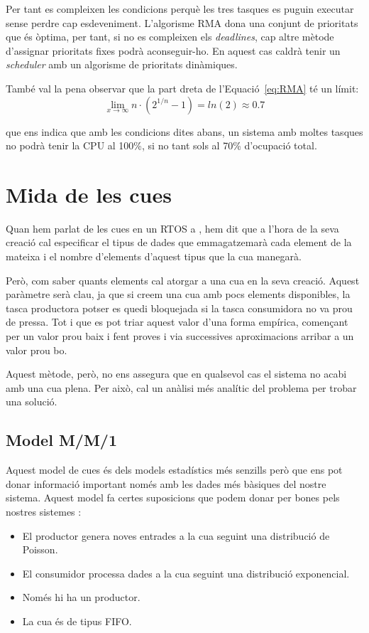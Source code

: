 Per tant es compleixen les condicions perquè les tres tasques es puguin executar sense perdre cap esdeveniment. L'algorisme RMA dona una conjunt de prioritats que és òptima, per tant, si no es compleixen els {\em deadlines}, cap altre mètode d'assignar prioritats fixes podrà aconseguir-ho. En aquest cas caldrà tenir un {\em scheduler} amb un algorisme de prioritats dinàmiques.

També val la pena observar que la part dreta de l'Equació~\ref{eq:RMA} té un límit:
\begin{equation*}
 \lim_{x\to\infty} n \cdot (2^{1/n}-1) = ln(2) \approx 0.7
\end{equation*}

que ens indica que amb les condicions dites abans, un sistema amb moltes tasques no podrà tenir la CPU al 100\%, si no tant sols al 70\% d'ocupació total.

\section{Mida de les cues}
\label{sec:mida_cues}
Quan hem parlat de les cues en un \gls{RTOS} a , hem dit que a l'hora de la seva creació cal especificar el tipus de dades que emmagatzemarà cada element de la mateixa i el nombre d'elements d'aquest tipus que la cua manegarà.

Però, com saber quants elements cal atorgar a una cua en la seva creació. Aquest paràmetre serà clau, ja que si creem una cua amb pocs elements disponibles, la tasca productora potser es quedi bloquejada si la tasca consumidora no va prou de pressa. Tot i que es pot triar aquest valor d'una forma empírica, començant per un valor prou baix i fent proves i via successives aproximacions arribar a un valor prou bo.

Aquest mètode, però, no ens assegura que en qualsevol cas el sistema no acabi amb una cua plena. Per això, cal un anàlisi més analític del problema per trobar una solució.

\subsection{Model M/M/1}
\label{sub:mm1}

Aquest model de cues és dels models estadístics més senzills però que ens pot donar informació important només amb les dades més bàsiques del nostre sistema. Aquest model fa certes suposicions que podem donar per bones pels nostres sistemes \cite{mm1_1}\cite{mm1_2}\cite{mm1_3}\cite{mm1_4}:
\begin{itemize}
 \item El productor genera noves entrades a la cua seguint una distribució de Poisson.
 \item El consumidor processa dades a la cua seguint una distribució exponencial.
 \item Només hi ha un productor.
 \item La cua és de tipus FIFO.
\end{itemize}

